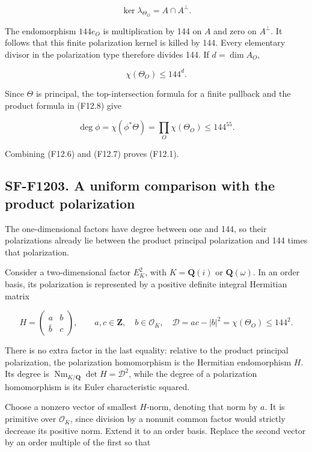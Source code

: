 \[
 \ker\lambda_{\Theta_O}=A\cap A^\perp.
\]

The endomorphism \(144e_O\) is multiplication by 144 on \(A\) and zero
on \(A^\perp\). It follows that this finite polarization kernel is
killed by 144. Every elementary divisor in the polarization type
therefore divides 144. If \(d=\dim A_O\),

\[
 \chi(\Theta_O)\le144^d.
 \tag{F12.9}
\]

Since \(\Theta\) is principal, the top-intersection formula for a finite
pullback and the product formula in (F12.8) give

\[
 \deg\phi=\chi(\phi^*\Theta)
       =\prod_O\chi(\Theta_O)\le144^{55}.
 \tag{F12.10}
\]

Combining (F12.6) and (F12.7) proves (F12.1).

\subsection{SF-F1203. A uniform comparison with the product
polarization}\label{SF-F1203}

The one-dimensional factors have degree between one and 144, so their
polarizations already lie between the product principal polarization and
144 times that polarization.

Consider a two-dimensional factor \(E_K^2\), with \(K=\mathbf Q(i)\) or
\(\mathbf Q(\omega)\). In an order basis, its polarization is
represented by a positive definite integral Hermitian matrix

\[
 H=\begin{pmatrix}a&b\\\bar b&c\end{pmatrix},
 \qquad a,c\in\mathbf Z,\quad b\in\mathcal O_K,\quad
 \mathcal D=ac-|b|^2=\chi(\Theta_O)\le144^2.
 \tag{F12.11}
\]

There is no extra factor in the last equality: relative to the product
principal polarization, the polarization homomorphism is the Hermitian
endomorphism \(H\). Its degree is
\(\operatorname{Nm}_{K/\mathbf Q}\det H=\mathcal D^2\), while the degree
of a polarization homomorphism is its Euler characteristic squared.

Choose a nonzero vector of smallest \(H\)-norm, denoting that norm by
\(a\). It is primitive over \(\mathcal O_K\), since division by a
nonunit common factor would strictly decrease its positive norm. Extend
it to an order basis. Replace the second vector by an order multiple of
the first so that

